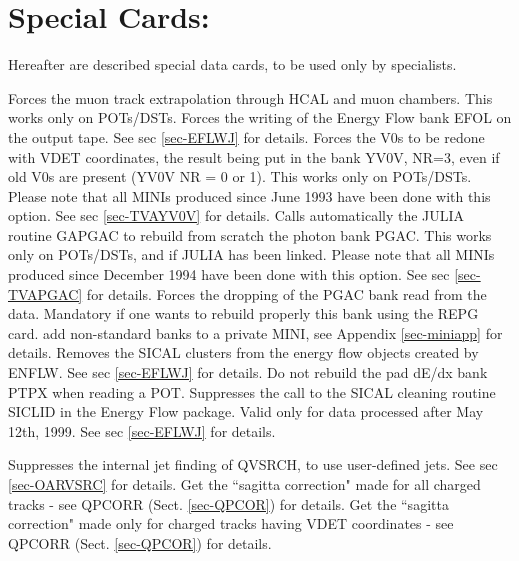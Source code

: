 \section{\label{sec-DCSPCA}Special Cards:}
\par
\par Hereafter are described special data cards, to be used only by specialists.
\begin{indentlist}{ 2.50cm}{ 2.75cm}
Forces the muon track extrapolation through HCAL and muon chambers.
This works only on POTs/DSTs.                                            
Forces the writing of the Energy Flow bank EFOL on the output tape.
See sec \ref{sec-EFLWJ} for details.
Forces the V0s to be redone with VDET coordinates, the result being put in the
bank YV0V, NR=3, even if old V0s are present (YV0V NR = 0 or 1). This works only on POTs/DSTs.
Please note that all MINIs produced since June 1993 have been done with this option.
See sec \ref{sec-TVAYV0V} for details.
Calls automatically the JULIA routine GAPGAC to rebuild from scratch the photon bank PGAC.
This works only on POTs/DSTs, and if JULIA has been linked.
Please note that all MINIs produced  since December 1994 have been done with this option.
See sec \ref{sec-TVAPGAC} for details.
Forces the dropping of the PGAC bank read from the data. Mandatory if one wants to rebuild
properly this bank using the REPG card.
  add non-standard banks to a private MINI, see Appendix \ref{sec-miniapp} for details.
Removes the SICAL clusters from the energy flow objects created by ENFLW.
See sec \ref{sec-EFLWJ} for details.
Do not rebuild the pad dE/dx bank PTPX when reading a POT.
Suppresses the call to the SICAL cleaning routine SICLID in the Energy Flow package.
Valid only for data processed after May 12th, 1999.
See sec \ref{sec-EFLWJ} for details.

Suppresses the internal jet finding of QVSRCH, to use user-defined jets.
See sec \ref{sec-OARVSRC} for details.
Get the ``sagitta correction" made for all charged tracks - see QPCORR (Sect. \ref{sec-QPCOR})
for details.
Get the ``sagitta correction" made only for charged tracks having VDET coordinates -
 see QPCORR (Sect. \ref{sec-QPCOR})
for details.
 
\end{indentlist}
